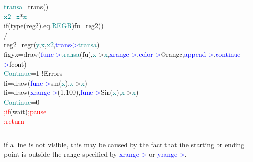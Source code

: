 \begin{example}[drawlineex]
\textcolor{teal}{transa}=\textcolor{VioletRed}{trans}()\\ 
\textcolor{teal}{x2}=\textcolor{teal}{x}*\textcolor{teal}{x}\\ 
\textcolor{VioletRed}{if}(\textcolor{VioletRed}{type}(reg2).eq.\textcolor{teal}{REGR})fu=reg2()\\ 
/                                                                                              \\ 
reg2=\textcolor{VioletRed}{regr}(\textcolor{teal}{y},\textcolor{teal}{x},\textcolor{teal}{x2},\textcolor{blue}{trans->}\textcolor{teal}{transa})\\ 
figyx=\textcolor{VioletRed}{draw}(\textcolor{blue}{func->}\textcolor{teal}{transa}(fu),\textcolor{teal}{x}->\textcolor{teal}{x},\textcolor{blue}{xrange->},\textcolor{blue}{color->}Orange,\textcolor{blue}{append->},\textcolor{blue}{continue->}fcont)\\ 
\textcolor{teal}{Continue}=1\,\,{\color{ForestGreen}!Errors}\\ 
fi=\textcolor{VioletRed}{draw}(\textcolor{blue}{func->}\textcolor{VioletRed}{sin}(\textcolor{teal}{x}),\textcolor{teal}{x}->\textcolor{teal}{x})\\ 
fi=\textcolor{VioletRed}{draw}(\textcolor{blue}{xrange->}(1,100),\textcolor{blue}{func->}Sin(\textcolor{teal}{x}),\textcolor{teal}{x}->\textcolor{teal}{x})\\ 
\textcolor{teal}{Continue}=0\\ 
\textcolor{Red}{;if}(wait)\textcolor{Red}{;pause}\\ 
\textcolor{Red}{;return}\\ 
\end{example} 
\vspace{-7mm} \rule{5cm}{0.1pt} 
\onehalfspacing 
\begin{note} 
if a line is not visible, this may be caused by the fact that 
the starting or ending point is outside the range specified by \textcolor{blue}{xrange->} or \textcolor{blue}{yrange->}. 
\end{note} 
